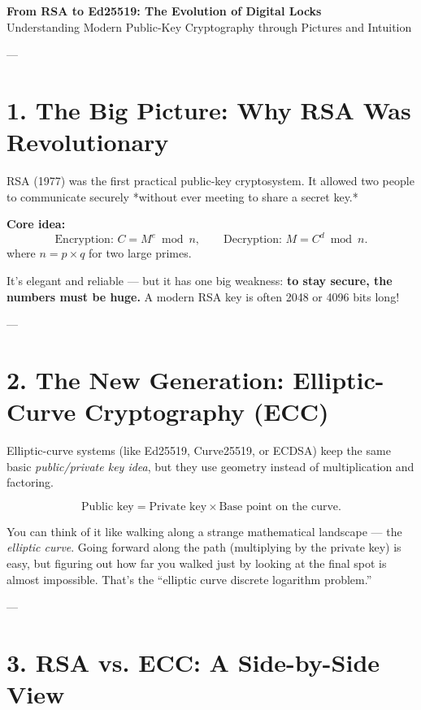 \documentclass[12pt]{article}
\begin{document}
\begin{center}
    {\LARGE \textbf{From RSA to Ed25519: The Evolution of Digital Locks}}\\[1em]
    {\large Understanding Modern Public-Key Cryptography through Pictures and Intuition}
\end{center}

---

\section*{1. The Big Picture: Why RSA Was Revolutionary}

RSA (1977) was the first practical public-key cryptosystem.
It allowed two people to communicate securely *without ever meeting to share a secret key.*

\vspace{0.5em}
\noindent\textbf{Core idea:}
\[
\text{Encryption: } C = M^e \bmod n,
\qquad
\text{Decryption: } M = C^d \bmod n.
\]
where \(n = p \times q\) for two large primes.

It’s elegant and reliable — but it has one big weakness:  
\textbf{to stay secure, the numbers must be huge.}  
A modern RSA key is often 2048 or 4096 bits long!

---

\section*{2. The New Generation: Elliptic-Curve Cryptography (ECC)}

Elliptic-curve systems (like Ed25519, Curve25519, or ECDSA) keep the same basic \emph{public/private key idea},  
but they use geometry instead of multiplication and factoring.

\[
\text{Public key} = \text{Private key} \times \text{Base point on the curve}.
\]

You can think of it like walking along a strange mathematical landscape — the \emph{elliptic curve}.  
Going forward along the path (multiplying by the private key) is easy,  
but figuring out how far you walked just by looking at the final spot is almost impossible.  
That’s the “elliptic curve discrete logarithm problem.”

---

\section*{3. RSA vs. ECC: A Side-by-Side View}
\end{document}
